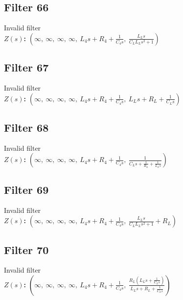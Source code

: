 \documentclass{article}
\begin{document}
\subsection*{Filter 66}
Invalid filter \\ 
\textbf{$Z(s)$:} $\left( \infty, \  \infty, \  \infty, \  \infty, \  L_{4} s + R_{4} + \frac{1}{C_{4} s}, \  \frac{L_{L} s}{C_{L} L_{L} s^{2} + 1}\right)$ \\ 
\subsection*{Filter 67}
Invalid filter \\ 
\textbf{$Z(s)$:} $\left( \infty, \  \infty, \  \infty, \  \infty, \  L_{4} s + R_{4} + \frac{1}{C_{4} s}, \  L_{L} s + R_{L} + \frac{1}{C_{L} s}\right)$ \\ 
\subsection*{Filter 68}
Invalid filter \\ 
\textbf{$Z(s)$:} $\left( \infty, \  \infty, \  \infty, \  \infty, \  L_{4} s + R_{4} + \frac{1}{C_{4} s}, \  \frac{1}{C_{L} s + \frac{1}{R_{L}} + \frac{1}{L_{L} s}}\right)$ \\ 
\subsection*{Filter 69}
Invalid filter \\ 
\textbf{$Z(s)$:} $\left( \infty, \  \infty, \  \infty, \  \infty, \  L_{4} s + R_{4} + \frac{1}{C_{4} s}, \  \frac{L_{L} s}{C_{L} L_{L} s^{2} + 1} + R_{L}\right)$ \\ 
\subsection*{Filter 70}
Invalid filter \\ 
\textbf{$Z(s)$:} $\left( \infty, \  \infty, \  \infty, \  \infty, \  L_{4} s + R_{4} + \frac{1}{C_{4} s}, \  \frac{R_{L} \left(L_{L} s + \frac{1}{C_{L} s}\right)}{L_{L} s + R_{L} + \frac{1}{C_{L} s}}\right)$ \\ 
\end{document}

